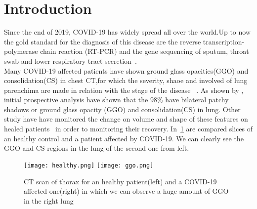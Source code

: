 \documentclass{standalone}
\begin{document}
\chapter*{Introduction}


Since the end of 2019, COVID-19 has widely spread all over the world.Up to now the gold standard for the diagnosis of this disease are the reverse transcription-polymerase chain reaction (RT-PCR) and the gene sequencing of sputum, throat swab and lower respiratory tract secretion~\cite{ART:Zhao}.\\ Many COVID-19 affected patients have shown ground glass opacities(GGO) and consolidation(CS) in chest CT,for which the severity, shaoe and involved of lung parenchima are made in relation with the stage of the disease ~\cite{ART:Bernheim}.  As shown by \cite{ART:Huang}, initial prospective analysis have shown that the $98\%$ have bilateral patchy shadows or ground glass opacity (GGO) and consolidation(CS) in lung. Other study have have monitored the change on volume and shape of these features on healed patients~\cite{ART:Ai} in order to monitoring their recovery. In \figurename\,\ref{fig:HealthVSCovid} are compared slices of an healthy control and a patient affected by COVID-19. We can clearly see the GGO and CS regions in the lung of the second one from left.\\
	
\begin{figure}[h!]
	\centering
	\texttt{[image: healthy.png]}
	\quad
	\texttt{[image: ggo.png]}
	\caption{CT scan of thorax for an healthy patient(left) and a COVID-19 affected one(right) in which we can observe a huge amount of GGO in the right lung}\label{fig:HealthVSCovid}
\end{figure} 
\end{document}
